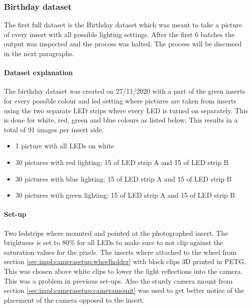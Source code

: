 			\subsubsection{Birthday dataset}
			\label{sec:impl:dataset:birthday}
			
			The first full dataset is the Birthday dataset which was meant to take a picture of every insert with all possible lighting settings. After the first 6 batches the output was inspected and the process was halted. The process will be discussed in the next paragraphs.
		

			\paragraph{Dataset explanation}
			The birthday dataset was created on 27/11/2020 with a part of the given inserts for every possible colour and led setting where pictures are taken from inserts using the two separate LED strips where every LED is turned on separately. This is done for white, red, green and blue colours as listed below. This results in a total of 91 images per insert side.

			\begin{itemize}
				\item 1 picture with all LEDs on white
				\item 30 pictures with red lighting; 15 of LED strip A and 15 of LED strip B
				\item 30 pictures with blue lighting; 15 of LED strip A and 15 of LED strip B
				\item 30 pictures with green lighting; 15 of LED strip A and 15 of LED strip B
			\end{itemize}



			\paragraph{Set-up}
			Two ledstrips where mounted and pointed at the photographed insert. The brightness is set to 80\% for all LEDs to make sure to not clip against the saturation values for the pixels. The inserts where attached to the wheel from section \ref{sec:impl:camerasetup:wheelholder} with black clips 3D printed in PETG. This was chosen above white clips to lower the light reflections into the camera. This was a problem in previous set-ups.
			Also the sturdy camera mount from section \ref{sec:impl:camerasetup:cameramount} was used to get better notice of the placement of the camera opposed to the insert. 


